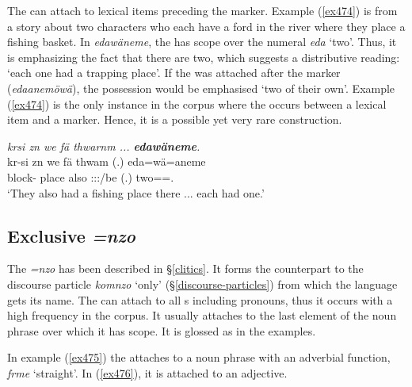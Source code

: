 The   can attach to lexical items preceding the  marker. Example (\ref{ex474}) is from a story about two characters who each have a ford in the river where they place a fishing basket. In \emph{edawäneme}, the  has scope over the numeral \emph{eda} `two'. Thus, it is emphasizing the fact that there are two, which suggests a distributive reading: `each one had a trapping place'. If the  was attached after the  marker (\emph{edaanemöwä}), the possession would be emphasised `two of their own'. Example (\ref{ex474}) is the only instance in the corpus where the   occurs between a lexical item and a  marker. Hence, it is a possible yet very rare construction. 
 
\begin{exe}
	\ex \emph{krsi zn we fä thwarnm ... \textbf{edawäneme}.}\\
	\gll kr-si zn we fä thwam (.) eda=wä=aneme\\
	block-\Nmlz{} place also \Dist{} \Stdu:\Io:\Pst:\Dur/be (.) two=\Emph=\Poss.\Nsg{}\\
	\trans `They also had a fishing place there ... each had one.'\\
	\label{ex474}
\end{exe}

\subsection{Exclusive \emph{=nzo}} \label{exclusivenzo}

The   \emph{=nzo} has been described in \S{}\ref{clitics}. It forms the  counterpart to the discourse particle \emph{komnzo} `only' (\S{}\ref{discourse-particles}) from which the language gets its name. The   can attach to all s including pronouns, thus it occurs with a high frequency in the corpus. It usually attaches to the last element of the noun phrase over which it has scope. It is glossed as \Only{} in the examples.%

In example (\ref{ex475}) the   attaches to a noun phrase with an adverbial function, \emph{frme} `straight'. In (\ref{ex476}), it is attached to an adjective.

